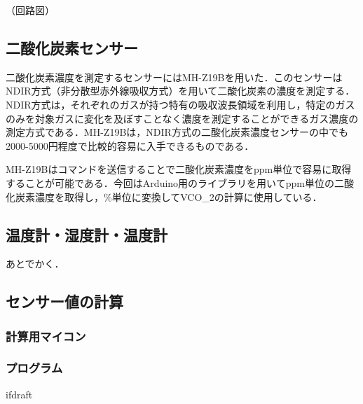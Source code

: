 （回路図）

\subsection{二酸化炭素センサー}

二酸化炭素濃度を測定するセンサーにはMH-Z19Bを用いた．このセンサーはNDIR方式（非分散型赤外線吸収方式）を用いて二酸化炭素の濃度を測定する．NDIR方式は，それぞれのガスが持つ特有の吸収波長領域を利用し，特定のガスのみを対象ガスに変化を及ぼすことなく濃度を測定することができるガス濃度の測定方式である\cite{whats_ndir}．MH-Z19Bは，NDIR方式の二酸化炭素濃度センサーの中でも2000-5000円程度で比較的容易に入手できるものである．

MH-Z19Bはコマンドを送信することで二酸化炭素濃度をppm単位で容易に取得することが可能である．今回はArduino用のライブラリを用いてppm単位の二酸化炭素濃度を取得し，\%単位に変換してVCO_2の計算に使用している．

\subsection{温度計・湿度計・温度計}

あとでかく．

\subsection{センサー値の計算}

\subsubsection{計算用マイコン}

\subsubsection{プログラム}

\expandafter\ifx\csname ifdraft\endcsname\relax
  
\fi
